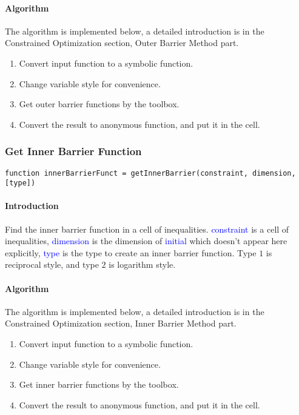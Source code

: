 \documentclass{article}
\begin{document}
\paragraph{Algorithm}
The algorithm is implemented below, a detailed introduction is in the Constrained Optimization section, Outer Barrier Method part.
\begin{enumerate}
    \item Convert input function to a symbolic function.
    \item Change variable style for convenience.
    \item Get outer barrier functions by the toolbox.
    \item Convert the result to anonymous function, and put it in the cell.
\end{enumerate}

\subsubsection{Get Inner Barrier Function}
\begin{verbatim}
function innerBarrierFunct = getInnerBarrier(constraint, dimension, [type])
\end{verbatim}
\paragraph{Introduction}
Find the inner barrier function in a cell of inequalities. \textcolor{blue}{constraint} is a cell of inequalities, \textcolor{blue}{dimension} is the dimension of \textcolor{blue}{initial} which doesn't appear here explicitly, \textcolor{blue}{type} is the type to create an inner barrier function. Type $1$ is reciprocal style, and type $2$ is logarithm style.

\paragraph{Algorithm}
The algorithm is implemented below, a detailed introduction is in the Constrained Optimization section, Inner Barrier Method part.
\begin{enumerate}
    \item Convert input function to a symbolic function.
    \item Change variable style for convenience.
    \item Get inner barrier functions by the toolbox.
    \item Convert the result to anonymous function, and put it in the cell.
\end{enumerate}
\end{document}
